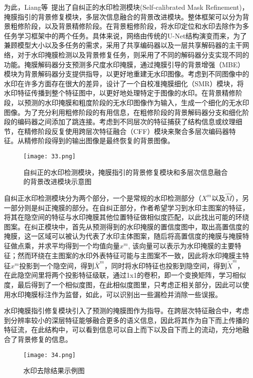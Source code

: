 为此，Liang等~\cite{liang2021visible}提出了自纠正的水印检测模块(Self-calibrated Mask Refinement)，掩膜指引的背景修复模块，多层次信息融合的背景改进模块。整体框架可以分为背景粗修阶段，以及背景精修阶段。在背景粗修阶段，将水印定位和水印去除作为多任务学习框架中的两个任务。具体来说，网络由传统的U-Net结构演变而来，为了兼顾模型大小以及多任务的需求，采用了共享编码器以及一层共享解码器的主干网络，对于水印掩膜检测以及背景修复任务，则采用了不同的解码器分支实现不同的功能。掩膜解码器分支预测多尺度水印掩膜，通过掩膜引导的背景增强（MBE）模块为背景解码器分支提供指导，以更好地重建无水印图像。考虑到不同图像中的水印在许多方面存在很大的差异，设计了一个自校准掩膜细化（SMR）模块，将水印特征传播到整个特征图中，以更好地处理特定于图像的水印。在背景精修阶段，以预测的水印掩膜和粗度阶段的无水印图像作为输入，生成一个细化的无水印图像。为了充分利用粗修阶段的有用信息，在粗修阶段的背景解码器分支和细化阶段的编码器之间添加了跳连接。考虑到不同层次的特征捕获了结构信息或纹理细节，在精修阶段反复使用跨层次特征融合（CFF）模块来聚合多层次编码器特征。从精修阶段得到的输出图像是最终恢复的背景图像。

\begin{figure}[!htbp]
	\centering
	\texttt{[image: 33.png]}
	\caption{自纠正的水印检测模块，掩膜指引的背景修复模块和多层次信息融合的背景改进模块示意图}
	\label{fig:33}
\end{figure}


自纠正水印检测模块分为两个部分，一个是常规的水印检测部分（$X^m$以及$\hat{M}$），另一部分则是纠正掩膜的部分。在自纠正部分，作者希望学习到水印主图案的特征，将其在隐空间的特征与水印掩膜其他位置特征做相似度匹配，以此找出可能的环绕图案。在纠正模块中，首先从预测得到的水印掩膜的置信度图中，取出高置信度的掩膜，这一区域可以被认为代表了水印主体图案，随后将高置信度的掩膜与掩膜特征做点乘，并求平均得到一个均值向量$x^m$, 该向量可以表示为水印掩膜的主要特征；然而环绕在主图案的水印外表特征可能与主图案不一致，因此将水印掩膜主特征$x^m$投影到一个隐空间，得到$\bar{X}^m$，同时将水印特征也投影到隐空间，得到$\tilde{X}^m$，在此隐空间里将两个投影特征级联，通过1x1的卷积，即一个变换矩阵，学习相似度，最后得到了一个相似度图，在此相似度图里，只考虑正相关部分，因此可以使用水印掩膜标注作为监督，如此，可以识别出一些漏检并消除一些误报。

水印掩膜指引修复模块引入了预测的掩膜图作为指导。在跨层次特征融合中，考虑到分辨率较小的深层特征能够融合更多的语义信息，因此将其作为自下而上传播的特征流，在此结构中，可以看到信息可以自上而下以及自下而上的流动，充分地融合了背景修复的信息。

\begin{figure}[!htbp]
	\centering
	\texttt{[image: 34.png]}
	\caption{水印去除结果示例图}
	\label{fig:34}
\end{figure}